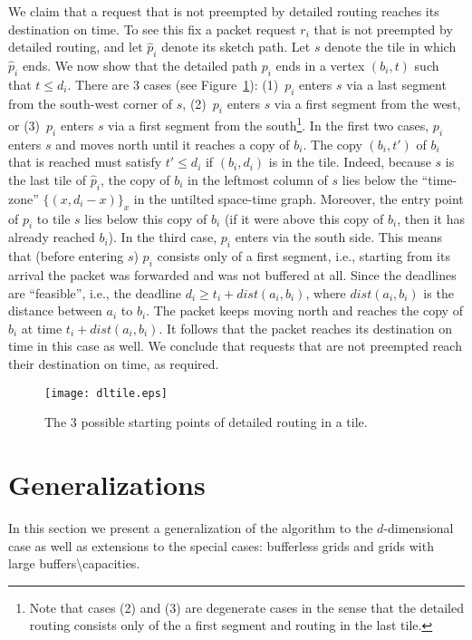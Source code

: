 \documentclass[11pt]{article}
\newenvironment{proof sketch}[1]{\noindent {\emph{Proof sketch of #1:}}}{\hfill \qed}
\begin{document}
We claim that a request that is not preempted by detailed routing reaches its destination on time.
To see this fix a packet request $r_i$ that is not preempted by detailed routing, and
let $\hat p_i$ denote its sketch path. Let $s$ denote the tile in which $\hat
p_i$ ends.  We now show that the detailed path $p_i$ ends in a vertex $(b_i,t)$ such
that $t \leq d_i$.  There are $3$ cases (see
Figure~\ref{fig:dltile}): (1)~$p_i$ enters $s$ via a last segment from
the south-west corner of $s$, (2)~$p_i$ enters $s$ via a first segment from the west,
or (3)~$p_i$ enters $s$ via a first segment from the south\footnote{ Note that
  cases (2) and (3) are degenerate cases in the sense that the detailed routing
  consists only of the a first segment and routing in the last tile.}.  In the first two cases, $p_i$ enters $s$ and moves north
until it reaches a copy of $b_i$.  The copy $(b_i,t')$ of $b_i$ that is reached must
satisfy $t' \leq d_i$ if $(b_i,d_i)$ is in the tile.  Indeed, because $s$ is the last
tile of $\hat p_i$, the copy of $b_i$ in the leftmost column of $s$ lies below the
``time-zone'' $\{(x,d_i-x)\}_x$ in the untilted space-time graph. Moreover, the entry point
of $p_i$ to tile $s$ lies below this copy of $b_i$ (if it were above this copy of
$b_i$, then it has already reached $b_i$).  In the third case, $p_i$ enters via the
south side. This means that (before entering $s$) $p_i$ consists only of a first
segment, i.e., starting from its arrival the packet was forwarded and was not
buffered at all.  Since the deadlines are ``feasible'', i.e., the deadline $d_i \geq
t_i + dist(a_i,b_i)$, where $dist(a_i,b_i)$ is the distance between $a_i$ to $b_i$.
The packet keeps moving north and reaches the copy of $b_i$ at time $t_i +
dist(a_i,b_i)$. It follows that the packet reaches its destination on time in this
case as well.  We conclude that requests that are not preempted reach their
destination on time, as required.

\begin{figure}[H]
  \centering
    \texttt{[image: dltile.eps]}
  \caption{The $3$ possible starting points of detailed routing in a tile.}
    \label{fig:dltile}
\end{figure}

\section{Generalizations}\label{sec:generalizations}
In this section we present a generalization of the algorithm to the $d$-dimensional case as well as extensions to the special cases: bufferless grids and grids with large buffers\textbackslash capacities.
\end{document}
